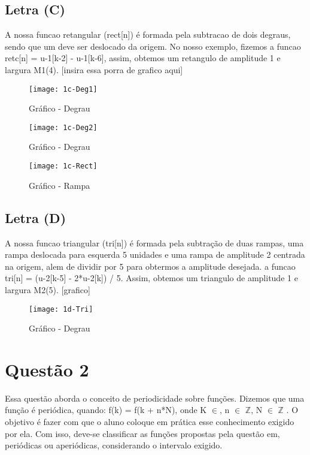\documentclass[12pt,a4paper]{report}
\begin{document}
	\subsection{Letra (C)}
	A nossa funcao retangular (rect[n]) é formada pela subtracao de dois degraus, sendo que um deve ser deslocado da origem. No nosso exemplo, fizemos a funcao retc[n] =  u-1[k-2] - u-1[k-6], assim, obtemos um retangulo de amplitude 1 e largura M1(4). [insira essa porra de grafico aqui]
			\begin{figure}[!ht]
				\centering
				\texttt{[image: 1c-Deg1]}
				\caption{Gráfico - Degrau}
			\end{figure}

			\begin{figure}[!ht]
				\centering
				\texttt{[image: 1c-Deg2]}
				\caption{Gráfico - Degrau}
			\end{figure}

			\begin{figure}[!ht]
				\centering
				\texttt{[image: 1c-Rect]}
				\caption{Gráfico - Rampa}
			\end{figure}
	
	\subsection{Letra (D)}
	A nossa funcao triangular (tri[n]) é formada pela subtração de duas rampas, uma rampa deslocada para esquerda 5 unidades e uma rampa de amplitude 2 centrada na origem, alem de dividir por 5 para obtermos a amplitude desejada. a funcao tri[n] = (u-2[k-5] - 2*u-2[k]) / 5. Assim, obtemos um triangulo de amplitude 1 e largura M2(5). [grafico]
	\begin{figure}[!ht]
				\centering
				\texttt{[image: 1d-Tri]}
				\caption{Gráfico - Degrau}
	\end{figure}


\section{Questão 2}
Essa questão aborda o conceito de periodicidade sobre funções. Dizemos que uma função é periódica, quando: f(k) = f(k + n*N), onde K $\in$, n $\in$ $\mathbb{Z}$, N $\in$ $\mathbb{Z}$ .
O objetivo é fazer com que o aluno coloque em prática esse conhecimento exigido por ela. Com isso, deve-se classificar as funções propostas pela questão em, periódicas ou aperiódicas, considerando o intervalo exigido.
\end{document}
